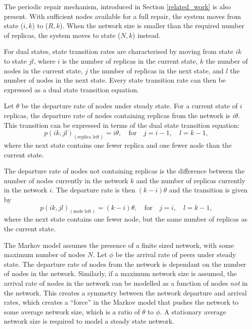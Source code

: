 The periodic repair mechanism, introduced in Section \ref{related_work} is also present. With sufficient nodes available for a full repair, the system moves from state ($i,k$) to ($R,k$). When the network size is smaller than the required number of replicas, the system moves to state ($N,k$) instead.

For dual states, state transition rates are characterised by moving from state $i k$ to state $j l$, where $i$ is the number of replicas in the current state, $k$ the number of nodes in the current state, $j$ the number of replicas in the next state, and $l$ the number of nodes in the next state. Every state transition rate can then be expressed as a dual state transition equation.

Let $\theta$ be the departure rate of nodes under steady state. For a current state of $i$ replicas, the departure rate of nodes containing replicas from the network is $i\theta$. This transition can be expressed in terms of the dual state transition equation:
%
\begin{equation} \label{eq_rep_left}
    p(i k,j l)_{(\textrm{replica left})} = i\theta,\quad\textrm{for}\quad j = i - 1,\quad l = k - 1,
\end{equation}
%
where the next state contains one fewer replica and one fewer node than the current state.

The departure rate of nodes not containing replicas is the difference between the number of nodes currently in the network $k$ and the number of replicas currently in the network $i$. The departure rate is then $(k - i)\theta$ and the transition is given by
%
\begin{equation} \label{eq_node_left}
    p(i k,j l)_{(\textrm{node left})} = (k - i)\theta,\quad\textrm{for}\quad j = i,\quad l = k - 1,
\end{equation}
%
where the next state contains one fewer node, but the same number of replicas as the current state.

The Markov model assumes the presence of a finite sized network, with some maximum number of nodes $N$. Let $\phi$ be the arrival rate of peers under steady state. The departure rate of nodes from the network is dependant on the number of nodes in the network. Similarly, if a maximum network size is assumed, the arrival rate of nodes in the network can be modelled as a function of nodes \emph{not} in the network. This creates a symmetry between the network departure and arrival rates, which creates a ``force'' in the Markov model that pushes the network to some average network size, which is a ratio of $\theta$ to $\phi$. A stationary average network size is required to model a steady state network.

